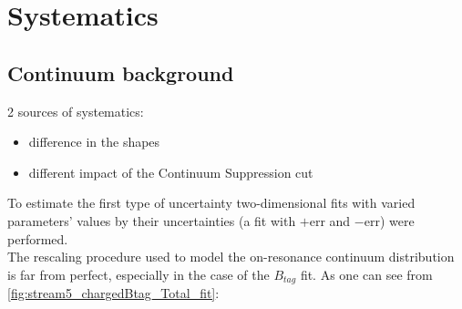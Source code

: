 \section{Systematics}


\subsection{Continuum background}\label{sec:continuumSysBtoLambdaC}

2 sources of systematics:
\begin{itemize}
\item difference in the shapes 
\item different impact of the Continuum Suppression cut
\end{itemize}

To estimate the first type of uncertainty two-dimensional fits with varied parameters' values by their uncertainties 
(a fit with $+$err and $-$err) were performed. \\
The rescaling procedure used to model the on-resonance continuum distribution is far from perfect, especially in the case of the $B_{tag}$ fit.
As one can see from \cref{fig:stream5_chargedBtag_Total_fit}:
\\
